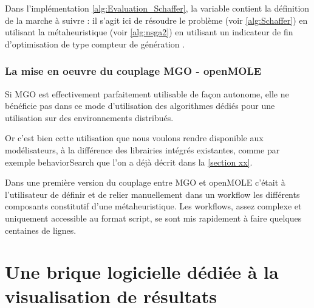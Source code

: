 Dans l'implémentation \ref{alg:Evaluation_Schaffer}, la variable   contient la définition de la marche à suivre : il s'agit ici de résoudre le problème  (voir \ref{alg:Schaffer}) en utilisant la métaheuristique  (voir \ref{alg:nsga2}) en utilisant un indicateur de fin d'optimisation de type compteur de génération . 

\subsubsection{La mise en oeuvre du couplage MGO - openMOLE }

Si MGO est effectivement parfaitement utilisable de façon autonome, elle ne bénéficie pas dans ce mode d'utilisation des algorithmes dédiés pour une utilisation sur des environnements distribués.

Or c'est bien cette utilisation que nous voulons rendre disponible aux modélisateurs, à la différence des librairies intégrés existantes, comme par exemple behaviorSearch que l'on a déjà décrit dans la \ref{section xx}.

Dans une première version du couplage entre MGO et openMOLE c'était à l'utilisateur de définir et de relier manuellement dans un workflow les différents composants constitutif d'une métaheuristique. Les workflows, assez complexe et uniquement accessible au format script, se sont mis rapidement à faire quelques centaines de lignes.




\section{Une brique logicielle dédiée à la visualisation de résultats}



